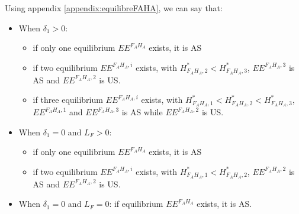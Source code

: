 \documentclass{article}
\begin{document}
\begin{itemize}
Using appendix \ref{appendix:equilibreFAHA}, we can say that:
\begin{itemize}
\item When $\delta_1 > 0$:
\begin{itemize}
\item if only one equilibrium $EE^{F_AH_A}$ exists, it is AS
\item if two equilibrium $EE^{F_AH_A, i}$ exists, with $H^*_{F_AH_A,2} < H^*_{F_AH_A,3}$, $EE^{F_AH_A, 3}$ is AS and  $EE^{F_AH_A, 2}$ is US.
\item if three equilibrium $EE^{F_AH_A, i}$ exists, with $H^*_{F_AH_A,1} < H^*_{F_AH_A,2} < H^*_{F_AH_A,3}$, $EE^{F_AH_A, 1}$ and $EE^{F_AH_A, 3}$ is AS while $EE^{F_AH_A, 2}$ is US.
\end{itemize}
\item When $\delta_1 = 0$ and $L_F > 0$:
\begin{itemize}
\item if only one equilibrium $EE^{F_AH_A}$ exists, it is AS
\item if two equilibrium $EE^{F_AH_A, i}$ exists, with $H^*_{F_AH_A,1} < H^*_{F_AH_A,2}$, $EE^{F_AH_A, 2}$ is AS and  $EE^{F_AH_A, 2}$ is US.
\end{itemize}
\item When $\delta_1 = 0$ and $L_F = 0$: if equilibrium $EE^{F_AH_A}$ exists, it is AS.
\end{itemize}


%


\end{itemize}
\end{document}
